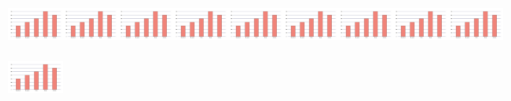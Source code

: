 \includegraphics[width=0.57293in,height=0.51122in]{media/image122.png}\includegraphics[width=0.57293in,height=0.51122in]{media/image122.png}\includegraphics[width=0.57293in,height=0.51122in]{media/image122.png}\includegraphics[width=0.57293in,height=0.51122in]{media/image122.png}\includegraphics[width=0.57293in,height=0.51122in]{media/image122.png}\includegraphics[width=0.57293in,height=0.51122in]{media/image122.png}\includegraphics[width=0.57293in,height=0.51122in]{media/image122.png}\includegraphics[width=0.57293in,height=0.51122in]{media/image122.png}\includegraphics[width=0.57293in,height=0.51122in]{media/image122.png}\includegraphics[width=0.57293in,height=0.51122in]{media/image122.png}

